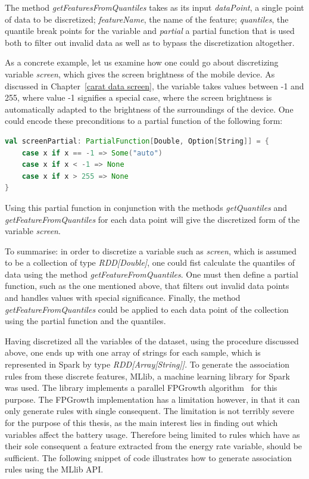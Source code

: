 The method \textit{getFeaturesFromQuantiles} takes as its input \textit{dataPoint}, a single point of data to be discretized; \textit{featureName}, the name of the feature; \textit{quantiles}, the quantile break points for the variable and \textit{partial} a partial function that is used both to filter out invalid data as well as to bypass the discretization altogether.

As a concrete example, let us examine how one could go about discretizing variable \textit{screen}, which gives the screen brightness of the mobile device. As discussed in Chapter~\ref{carat data screen}, the variable takes values between -1 and 255, where value -1 signifies a special case, where the screen brightness is automatically adapted to the brightness of the surroundings of the device. One could encode these preconditions to a partial function of the following form:
\begin{minipage}{\linewidth}
\begin{lstlisting}[language=scala] 
val screenPartial: PartialFunction[Double, Option[String]] = {
    case x if x == -1 => Some("auto")
    case x if x < -1 => None
	case x if x > 255 => None
}
\end{lstlisting}
\end{minipage} 
Using this partial function in conjunction with the methods \textit{getQuantiles} and \textit{getFeatureFromQuantiles} for each data point will give the discretized form of the variable \textit{screen}. 

To summarise: in order to discretize a variable such as \textit{screen}, which is assumed to be a collection of type \textit{RDD[Double]}, one could fist calculate the quantiles of data using the method \textit{getFeatureFromQuantiles}. One must then define a partial function, such as the one mentioned above, that filters out invalid data points and handles values with special significance. Finally, the method \textit{getFeatureFromQuantiles} could be applied to each data point of the collection using the partial function and the quantiles.

Having discretized all the variables of the dataset, using the procedure discussed above, one ends up with one array of strings for each sample, which is represented in Spark by type \textit{RDD[Array[String]]}. To generate the association rules from these discrete features, MLlib, a machine learning library for Spark was used. The library implements a parallel FPGrowth algorithm~\cite{Li:2008:PPF:1454008.1454027} for this purpose. The FPGrowth implementation has a limitation however, in that it can only generate rules with single consequent. The limitation is not terribly severe for the purpose of this thesis, as the main interest lies in finding out which variables affect the battery usage. Therefore being limited to rules which have as their sole consequent a feature extracted from the energy rate variable, should be sufficient. The following snippet of code illustrates how to generate association rules using the MLlib API.

